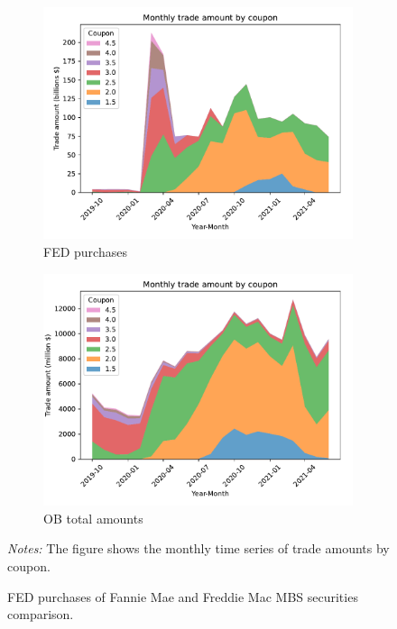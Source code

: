 \documentclass[11pt,a4paper]{article}
\begin{document}
\begin{figure}[h]
  \centering
  \begin{subfigure}[b]{0.7\textwidth}
    \includegraphics[width=0.998\textwidth]{../results/figures/fed_monthly_trade_amount_by_coupon.pdf}
    \caption{FED purchases}
   \end{subfigure}
   \begin{subfigure}[b]{0.7\textwidth}
    \includegraphics[width=0.998\textwidth]{../results/figures/ob_monthly_trade_amount_by_coupon_all_area.pdf}
    \caption{OB total amounts}
   \end{subfigure}
   \caption{FED purchases of Fannie Mae and Freddie Mac MBS securities comparison.} 
   \begin{minipage}{\textwidth}
    \footnotesize{\textit{Notes:} The figure shows the monthly time series of trade amounts by coupon. }
      \end{minipage}
\end{figure}
\end{document}
